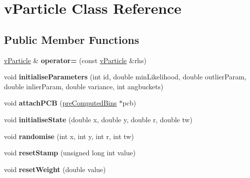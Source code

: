 \hypertarget{classvParticle}{}\section{v\+Particle Class Reference}
\label{classvParticle}
\subsection*{Public Member Functions}
\begin{DoxyCompactItemize}
\item 
\hyperlink{classvParticle}{v\+Particle} \& {\bfseries operator=} (const \hyperlink{classvParticle}{v\+Particle} \&rhs)\hypertarget{classvParticle_a7e2a56a487ab19d6b17ffd8fd26cf83e}{}\label{classvParticle_a7e2a56a487ab19d6b17ffd8fd26cf83e}

\item 
void {\bfseries initialise\+Parameters} (int id, double min\+Likelihood, double outlier\+Param, double inlier\+Param, double variance, int angbuckets)\hypertarget{classvParticle_aefc50d1edaeac94dd1fc58719cf8fb64}{}\label{classvParticle_aefc50d1edaeac94dd1fc58719cf8fb64}

\item 
void {\bfseries attach\+P\+CB} (\hyperlink{classpreComputedBins}{pre\+Computed\+Bins} $\ast$pcb)\hypertarget{classvParticle_a83f71814b1a873e5641e35d8e46439db}{}\label{classvParticle_a83f71814b1a873e5641e35d8e46439db}

\item 
void {\bfseries initialise\+State} (double x, double y, double r, double tw)\hypertarget{classvParticle_a6e4bf2f8057efb01ee6a24da7724a099}{}\label{classvParticle_a6e4bf2f8057efb01ee6a24da7724a099}

\item 
void {\bfseries randomise} (int x, int y, int r, int tw)\hypertarget{classvParticle_a4c7b748b2537bff55c893b4f6bc6ab39}{}\label{classvParticle_a4c7b748b2537bff55c893b4f6bc6ab39}

\item 
void {\bfseries reset\+Stamp} (unsigned long int value)\hypertarget{classvParticle_abefd506d8def5255654736e471db8a6d}{}\label{classvParticle_abefd506d8def5255654736e471db8a6d}

\item 
void {\bfseries reset\+Weight} (double value)\hypertarget{classvParticle_aaa4c200b9a67deb457e55d06672e16cf}{}\label{classvParticle_aaa4c200b9a67deb457e55d06672e16cf}


\end{DoxyCompactItemize}
